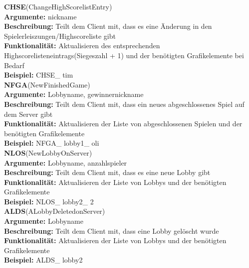 \documentclass[a4paper, 12pt, oneside, headsepline=.5pt,footsepline=.5pt]{scrartcl}
\begin{document}
{\large \textbf{CHSE}(ChangeHighScorelistEntry)} \\
\hspace{4ex} \textbf{Argumente:} {nickname} \\
\hspace{4ex} \textbf{Beschreibung:} {Teilt dem Client mit, dass es eine Änderung in den Spielerleiszungen/Highscoreliste gibt} \\
\hspace{4ex} \textbf{Funktionalität:} {Aktualisieren des entsprechenden Highscorelisteneintrags(Siegeszahl + 1) und der benötigten Grafikelemente bei Bedarf} \\
\hspace{4ex} \textbf{Beispiel:} {CHSE\_ tim} \\

{\large \textbf{NFGA}(NewFinishedGame)} \\
\hspace{4ex} \textbf{Argumente:} {Lobbyname, gewinnernickname} \\
\hspace{4ex} \textbf{Beschreibung:} {Teilt dem Client mit, dass ein neues abgeschlossenes Spiel auf dem Server gibt} \\
\hspace{4ex} \textbf{Funktionalität:} {Aktualisieren der Liste von abgeschlossenen Spielen und der benötigten Grafikelemente} \\
\hspace{4ex} \textbf{Beispiel:} {NFGA\_ lobby1\_ oli} \\

{\large \textbf{NLOS}(NewLobbyOnServer)} \\
\hspace{4ex} \textbf{Argumente:} {Lobbyname, anzahlspieler} \\
\hspace{4ex} \textbf{Beschreibung:} {Teilt dem Client mit, dass es eine neue Lobby gibt} \\
\hspace{4ex} \textbf{Funktionalität:} {Aktualisieren der Liste von Lobbys und der benötigten Grafikelemente} \\
\hspace{4ex} \textbf{Beispiel:} {NLOS\_ lobby2\_ 2} \\

{\large \textbf{ALDS}(ALobbyDeletedonServer)} \\
\hspace{4ex} \textbf{Argumente:} {Lobbyname} \\
\hspace{4ex} \textbf{Beschreibung:} {Teilt dem Client mit, dass eine Lobby gelöscht wurde} \\
\hspace{4ex} \textbf{Funktionalität:} {Aktualisieren der Liste von Lobbys und der benötigten Grafikelemente} \\
\hspace{4ex} \textbf{Beispiel:} {ALDS\_ lobby2} \\
\end{document}
